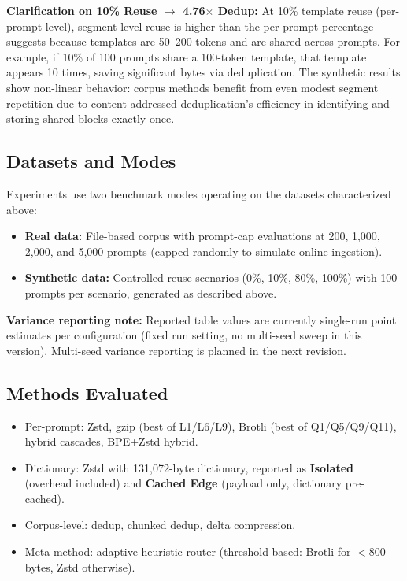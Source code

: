 \documentclass[10pt,conference]{IEEEtran}
\begin{document}
\textbf{Clarification on 10\% Reuse $\to$ 4.76$\times$ Dedup:} At 10\% template reuse (per-prompt level), segment-level reuse is higher than the per-prompt percentage suggests because templates are 50--200 tokens and are shared across prompts. For example, if 10\% of 100 prompts share a 100-token template, that template appears 10 times, saving significant bytes via deduplication. The synthetic results show non-linear behavior: corpus methods benefit from even modest segment repetition due to content-addressed deduplication's efficiency in identifying and storing shared blocks exactly once.

\subsection{Datasets and Modes}
Experiments use two benchmark modes operating on the datasets characterized above:
\begin{itemize}
    \item \textbf{Real data:} File-based corpus with prompt-cap evaluations at 200, 1,000, 2,000, and 5,000 prompts (capped randomly to simulate online ingestion).
    \item \textbf{Synthetic data:} Controlled reuse scenarios (0\%, 10\%, 80\%, 100\%) with 100 prompts per scenario, generated as described above.
\end{itemize}

\textbf{Variance reporting note:} Reported table values are currently single-run point estimates per configuration (fixed run setting, no multi-seed sweep in this version). Multi-seed variance reporting is planned in the next revision.

\subsection{Methods Evaluated}
\begin{itemize}
    \item Per-prompt: Zstd, gzip (best of L1/L6/L9), Brotli (best of Q1/Q5/Q9/Q11), hybrid cascades, BPE+Zstd hybrid.
    \item Dictionary: Zstd with 131,072-byte dictionary, reported as \textbf{Isolated} (overhead included) and \textbf{Cached Edge} (payload only, dictionary pre-cached).
    \item Corpus-level: dedup, chunked dedup, delta compression.
    \item Meta-method: adaptive heuristic router (threshold-based: Brotli for $<$800 bytes, Zstd otherwise).
\end{itemize}
\end{document}
